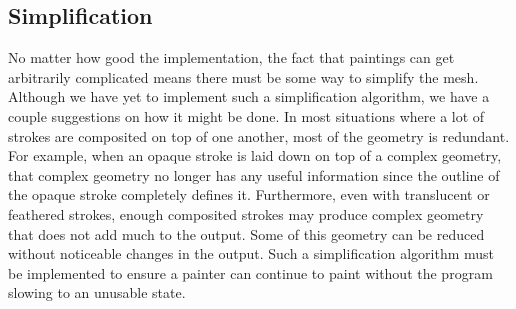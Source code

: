 \documentclass[review]{acmsiggraph}
\begin{document}
\subsection{Simplification}
No matter how good the implementation, the fact that paintings can get arbitrarily complicated
means there must be some way to simplify the mesh. Although we have yet to implement
such a simplification algorithm, we have a couple suggestions on how it might be done. In most situations where
a lot of strokes are composited on top of one another, most of the geometry is redundant. 
For example, when an opaque stroke is laid down on top of a complex geometry, that complex
geometry no longer has any useful information since the outline of the opaque stroke
completely defines it. Furthermore, even with translucent or feathered strokes, enough
composited strokes may produce complex geometry that does not add much to the output.
Some of this geometry can be reduced without noticeable changes in the output. Such a
simplification algorithm must be implemented to ensure a painter can continue to paint
without the program slowing to an unusable state.








\end{document}
